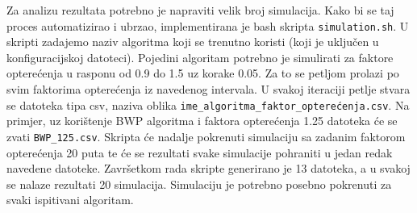 \documentclass[../zavrsni.tex]{subfiles}
\begin{document}
Za analizu rezultata potrebno je napraviti velik broj simulacija. Kako bi se taj proces automatizirao i ubrzao, implementirana 
je bash skripta \texttt{simulation.sh}. U skripti zadajemo naziv algoritma koji se trenutno koristi (koji je uključen u 
konfiguracijskoj datoteci). Pojedini algoritam potrebno je simulirati za faktore opterećenja u rasponu od 0.9 do 1.5 uz korake 0.05.
Za to se petljom prolazi po svim faktorima opterećenja iz navedenog intervala. U svakoj iteraciji petlje stvara se datoteka tipa
csv, naziva oblika \texttt{{ime\_algoritma}\_{faktor\_opterećenja}.csv}. Na primjer, uz korištenje BWP algoritma i faktora opterećenja 1.25 
datoteka će se zvati \texttt{BWP\_125.csv}. Skripta će nadalje pokrenuti simulaciju sa zadanim faktorom opterećenja 20 puta te će se rezultati 
svake simulacije pohraniti u jedan redak navedene datoteke. Završetkom rada skripte generirano je 13 datoteka, a u svakoj se nalaze rezultati 
20 simulacija. Simulaciju je potrebno posebno pokrenuti za svaki ispitivani algoritam.  
\end{document}
